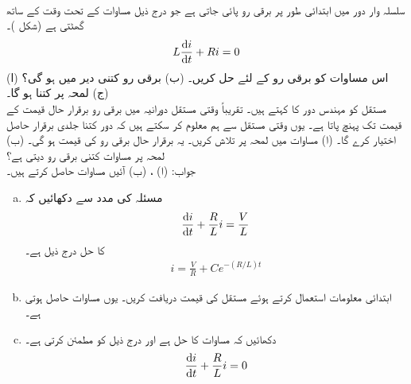 \\
سلسلہ وار  دور میں ابتدائی طور پر  برقی رو پائی جاتی ہے جو درج ذیل مساوات کے تحت وقت کے ساتھ گھٹتی ہے (شکل )۔
\begin{align*}
L\frac{\dif i}{\dif t}+Ri=0
\end{align*}
(ا) اس مساوات کو برقی رو  کے لئے حل کریں۔ (ب) برقی رو کتنی دیر میں  ہو گی؟ (ج) لمحہ  پر  کتنا ہو گا۔
\\
مستقل  کو مہندس  دور کا  کہتے ہیں۔ تقریباً  وقتی مستقل دورانیہ میں برقی رو برقرار حال قیمت کے  قیمت تک پہنچ پاتا ہے۔ یوں وقتی مستقل سے ہم معلوم کر سکتے ہیں کہ دور کتنا جلدی برقرار حاصل اختیار کرے گا۔ (ا) مساوات  میں لمحہ  پر  تلاش کریں۔ یہ برقرار حال برقی رو کی  قیمت ہو گی۔ (ب) لمحہ  پر  مساوات  کتنی برقی رو دیتی ہے؟\\
جواب:\quad
(ا) ، (ب) 
آئیں مساوات  حاصل کرتے ہیں۔ 
\begin{enumerate}[a.]
\item
مسئلہ  کی مدد سے دکھائیں کہ 
\begin{align*}
\frac{\dif i}{\dif t}+\frac{R}{L}i=\frac{V}{L}
\end{align*}
کا حل درج ذیل ہے۔
\begin{align*}
i=\frac{V}{R}+Ce^{-(R/L)t}
\end{align*}
\item
ابتدائی معلومات  استعمال کرتے ہوئے مستقل  کی قیمت دریافت کریں۔ یوں مساوات  حاصل ہوتی ہے۔
\item
دکھائیں کہ  مساوات  کا حل ہے اور درج ذیل  کو مطمئن کرتی ہے۔
\begin{align*}
\frac{\dif i}{\dif t}+\frac{R}{L}i=0
\end{align*}
\end{enumerate}
